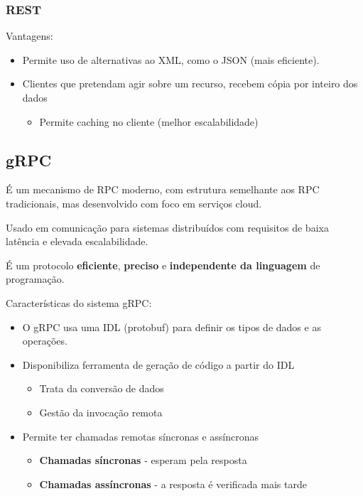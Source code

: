 \documentclass[12pt]{article}
\begin{document}
\subsubsection{REST}

Vantagens:
\begin{itemize}[topsep=4pt, itemsep=0pt]
    \item Permite uso de alternativas ao XML, como o JSON (mais eficiente).
    \item Clientes que pretendam agir sobre um recurso, recebem cópia por inteiro dos dados
    \begin{itemize}[topsep=0pt, itemsep=0pt]
        \item Permite caching no cliente (melhor escalabilidade)
    \end{itemize}
\end{itemize}

\newpage

\subsection{gRPC}

É um mecanismo de RPC moderno, com estrutura semelhante aos RPC tradicionais, mas desenvolvido com foco em serviços cloud. 

Usado em comunicação para sistemas distribuídos com requisitos de baixa latência e elevada escalabilidade.

É um protocolo \textbf{eficiente}, \textbf{preciso} e \textbf{independente da linguagem} de programação.

\vspace{12pt}
Características do sistema gRPC:
\begin{itemize}[topsep=4pt, itemsep=0pt]
    \item O gRPC usa uma IDL (protobuf) para definir os tipos de dados e as operações.
    \item Disponibiliza ferramenta de geração de código a partir do IDL
    \begin{itemize}[topsep=0pt, itemsep=0pt]
        \item Trata da conversão de dados
        \item Gestão da invocação remota
    \end{itemize}
    \item Permite ter chamadas remotas síncronas e assíncronas
    \begin{itemize}[topsep=0pt, itemsep=0pt]
        \item \textbf{Chamadas síncronas} - esperam pela resposta
        \item \textbf{Chamadas assíncronas} - a resposta é verificada mais tarde
    \end{itemize}
\end{itemize}
\end{document}
